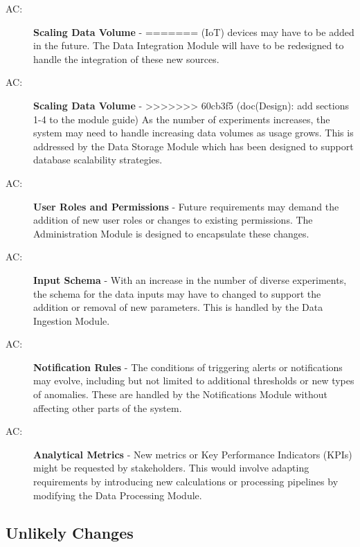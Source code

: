\documentclass[12pt, titlepage]{article}
\newcounter{acnum}
\newcommand{\actheacnum}{AC\theacnum}
\begin{document}
\begin{description}
  \item[ \actheacnum \label{acScaling}:] \textbf{Scaling Data Volume} - 
=======
  (IoT) devices may have to be added in the future. The Data Integration Module will have to be 
  redesigned to handle the integration of these new sources.

  \item[ \actheacnum \label{acStorage}:] \textbf{Scaling Data Volume} - 
>>>>>>> 60cb3f5 (doc(Design): add sections 1-4 to the module guide)
  As the number of experiments increases, the system may need to handle increasing data volumes
  as usage grows. This is addressed by the Data Storage Module which has been designed to support
  database scalability strategies.

  \item[ \actheacnum \label{acRoles}:] \textbf{User Roles and Permissions} - 
  Future requirements may demand the addition of new user roles or changes to existing permissions.
  The Administration Module is designed to encapsulate these changes.

  \item[ \actheacnum \label{acSchema}:] \textbf{Input Schema} - 
  With an increase in the number of diverse experiments, the schema for the data inputs may have to
  changed to support the addition or removal of new parameters. This is handled by the Data Ingestion
  Module.

  \item[ \actheacnum \label{acNotifs}:] \textbf{Notification Rules} - 
  The conditions of triggering alerts or notifications may evolve, including but not limited to
  additional thresholds or new types of anomalies. These are handled by the Notifications Module
  without affecting other parts of the system.
  
  \item[ \actheacnum \label{acMetrics}:] \textbf{Analytical Metrics} - 
  New metrics or Key Performance Indicators (KPIs) might be requested by stakeholders. This would
  involve adapting requirements by introducing new calculations or processing pipelines by modifying
  the Data Processing Module.
  
\end{description}

\subsection{Unlikely Changes} \label{SecUchange}
\end{document}
